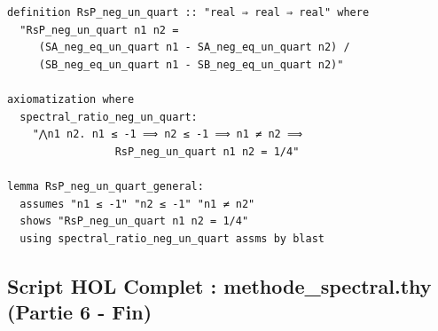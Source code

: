 \documentclass[a4paper,11pt]{article}
\begin{document}
\begin{holcode}[title={\textcolor{white}{Fichier : methode\_spectral.thy -- Partie 5/6}}]
\begin{lstlisting}
definition RsP_neg_un_quart :: "real ⇒ real ⇒ real" where
  "RsP_neg_un_quart n1 n2 =
     (SA_neg_eq_un_quart n1 - SA_neg_eq_un_quart n2) /
     (SB_neg_eq_un_quart n1 - SB_neg_eq_un_quart n2)"

axiomatization where
  spectral_ratio_neg_un_quart:
    "⋀n1 n2. n1 ≤ -1 ⟹ n2 ≤ -1 ⟹ n1 ≠ n2 ⟹
                 RsP_neg_un_quart n1 n2 = 1/4"

lemma RsP_neg_un_quart_general:
  assumes "n1 ≤ -1" "n2 ≤ -1" "n1 ≠ n2"
  shows "RsP_neg_un_quart n1 n2 = 1/4"
  using spectral_ratio_neg_un_quart assms by blast
\end{lstlisting}
\end{holcode}

\newpage
\subsection{Script HOL Complet : methode\_spectral.thy (Partie 6 - Fin)}
\end{document}
